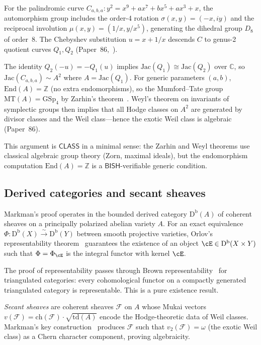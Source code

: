 \documentclass[11pt]{article}
\theoremstyle{plain}
\theoremstyle{definition}
\theoremstyle{remark}
\newcommand{\ZZ}{\mathbb{Z}}
\newcommand{\CC}{\mathbb{C}}
\newcommand{\cF}{\mathcal{F}}
\newcommand{\End}{\mathrm{End}}
\newcommand{\MT}{\mathrm{MT}}
\newcommand{\GSp}{\mathrm{GSp}}
\newcommand{\Jac}{\mathrm{Jac}}
\newcommand{\Db}{\mathrm{D^b}}
\newcommand{\BISH}{\mathsf{BISH}}
\newcommand{\CLASS}{\mathsf{CLASS}}
\begin{document}
For the palindromic curve $C_{a,b,a}: y^2 = x^9 + ax^7 + bx^5 +
ax^3 + x$, the automorphism group includes the order-4 rotation
$\sigma(x,y) = (-x, iy)$ and the reciprocal involution
$\mu(x,y) = (1/x, y/x^5)$, generating the dihedral group $D_8$ of
order~8.  The Chebyshev substitution $u = x + 1/x$ descends $C$ to
genus-2 quotient curves $Q_1, Q_2$ (Paper~86,~\cite{p86}).

The identity $Q_2(-u) = -Q_1(u)$ implies $\Jac(Q_1) \cong \Jac(Q_2)$
over $\CC$, so $\Jac(C_{a,b,a}) \sim A^2$ where $A = \Jac(Q_1)$.
For generic parameters $(a,b)$, $\End(A) = \ZZ$ (no extra
endomorphisms), so the Mumford--Tate group $\MT(A) = \GSp_4$ by
Zarhin's theorem~\cite{zarhin}.  Weyl's theorem on invariants of
symplectic groups then implies that all Hodge classes on $A^2$ are
generated by divisor classes and the Weil class---hence the exotic
Weil class is algebraic (Paper~86).

This argument is $\CLASS$ in a minimal sense: the Zarhin and Weyl
theorems use classical algebraic group theory (Zorn, maximal ideals),
but the endomorphism computation $\End(A) = \ZZ$ is a
$\BISH$-verifiable generic condition.

\subsection{Derived categories and secant sheaves}

Markman's proof operates in the bounded derived category $\Db(A)$ of
coherent sheaves on a principally polarized abelian variety $A$.
For an exact equivalence $\Phi: \Db(X) \xrightarrow{\sim} \Db(Y)$
between smooth projective varieties, Orlov's representability
theorem~\cite{orlov2003} guarantees the existence of an object
$\cE \in \Db(X \times Y)$ such that $\Phi = \Phi_\cE$ is the
integral functor with kernel $\cE$.

The proof of representability passes through Brown
representability~\cite{bondal-vdb2003} for triangulated categories:
every cohomological functor on a compactly generated triangulated
category is representable.  This is a pure existence result.

\emph{Secant sheaves} are coherent sheaves $\cF$ on $A$ whose Mukai
vectors $v(\cF) = \mathrm{ch}(\cF) \cdot \sqrt{\mathrm{td}(A)}$
encode the Hodge-theoretic data of Weil classes.  Markman's key
construction~\cite{markman2025} produces $\cF$ such that
$v_2(\cF) = \omega$ (the exotic Weil class) as a Chern character
component, proving algebraicity.
\end{document}
